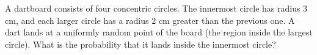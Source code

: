 A dartboard consists of four concentric circles. The innermost circle has radius $3$ cm, and each larger circle has a radius $2$ cm greater than the previous one. A dart lands at a uniformly random point of the board (the region inside the largest circle). What is the probability that it lands inside the innermost circle?

